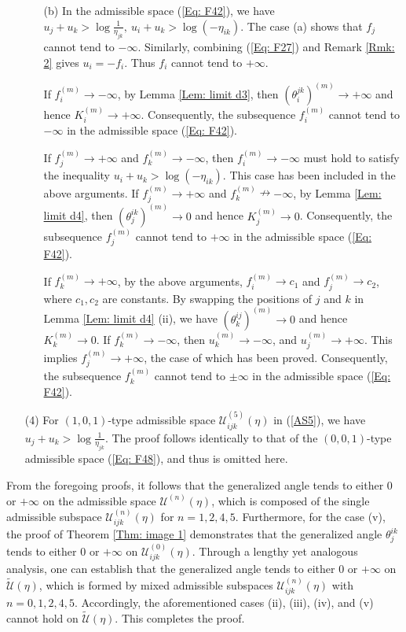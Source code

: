 \documentclass[12pt]{amsart}
\theoremstyle{definition}
\begin{document}
\begin{itemize}
\begin{itemize}
\item[(b)]
In the admissible space (\ref{Eq: F42}), we have $u_j+u_k>\log \frac{1}{\eta_{jk}},\  u_i+u_k>\log(-\eta_{ik})$.
The case (a) shows that $f_j$ cannot tend to $-\infty$.
Similarly, combining (\ref{Eq: F27}) and Remark \ref{Rmk: 2} gives $u_i=-f_i$.
Thus $f_i$ cannot tend to $+\infty$.

If $f_i^{(m)}\rightarrow -\infty$, by Lemma \ref{Lem: limit d3}, then $(\theta^{jk}_i)^{(m)}\rightarrow +\infty$ and hence $K^{(m)}_i\rightarrow +\infty$.
Consequently, the subsequence $f^{(m)}_i$ cannot tend to $-\infty$ in the admissible space (\ref{Eq: F42}).

If $f_j^{(m)}\rightarrow +\infty$ and  $f_k^{(m)}\rightarrow -\infty$,
then $f_i^{(m)}\rightarrow -\infty$ must hold to satisfy the inequality $u_i+u_k>\log(-\eta_{ik})$.
This case has been included in the above arguments.
If $f_j^{(m)}\rightarrow +\infty$ and  $f_k^{(m)}\nrightarrow -\infty$,
by Lemma \ref{Lem: limit d4}, then $(\theta^{ik}_j)^{(m)}\rightarrow 0$ and hence $K^{(m)}_j\rightarrow 0$.
Consequently, the subsequence $f^{(m)}_j$ cannot tend to $+\infty$ in the admissible space (\ref{Eq: F42}).

If $f_k^{(m)}\rightarrow +\infty$, by the above arguments, $f_i^{(m)}\rightarrow c_1$ and $f_j^{(m)}\rightarrow c_2$, where $c_1,c_2$ are constants.
By swapping the positions of $j$ and $k$ in Lemma \ref{Lem: limit d4} (ii), we have $(\theta^{ij}_k)^{(m)}\rightarrow 0$ and hence $K^{(m)}_k\rightarrow 0$.
If $f_k^{(m)}\rightarrow -\infty$, then $u_k^{(m)}\rightarrow -\infty$, and $u_j^{(m)}\rightarrow +\infty$.
This implies $f_j^{(m)}\rightarrow +\infty$, the case of which has been proved.
Consequently, the subsequence $f^{(m)}_k$ cannot tend to $\pm\infty$ in the admissible space (\ref{Eq: F42}).
\end{itemize}

\item[(4)]
For $(1,0,1)$-type admissible space $\mathcal{U}^{(5)}_{ijk}(\eta)$ in (\ref{AS5}), we have $u_j+u_k>\log \frac{1}{\eta_{jk}}$.
The proof follows identically to that of the $(0,0,1)$-type admissible space (\ref{Eq: F48}), and thus is omitted here.
\end{itemize}

From the foregoing proofs, it follows that the generalized angle tends to either $0$ or $+\infty$ on the admissible space $\mathcal{U}^{(n)}(\eta)$, 
which is composed of the single admissible subspace $\mathcal{U}^{(n)}_{ijk}(\eta)$ for $n = 1, 2, 4, 5$.
Furthermore, for the case (v), the proof of Theorem \ref{Thm: image 1} demonstrates that the generalized angle $\theta_j^{ik}$ tends to either $0$ or $+\infty$ on $\mathcal{U}^{(0)}_{ijk}(\eta)$.
Through a lengthy yet analogous analysis, one can establish that the generalized angle tends to either $0$ or $+\infty$ on $\widetilde{\mathcal{U}}(\eta)$, which is formed by mixed admissible subspaces $\mathcal{U}^{(n)}_{ijk}(\eta)$ with $n = 0, 1, 2, 4, 5$.
Accordingly, the aforementioned cases (ii), (iii), (iv), and (v) cannot hold on $\widetilde{\mathcal{U}}(\eta)$. 
This completes the proof.
\end{document}
